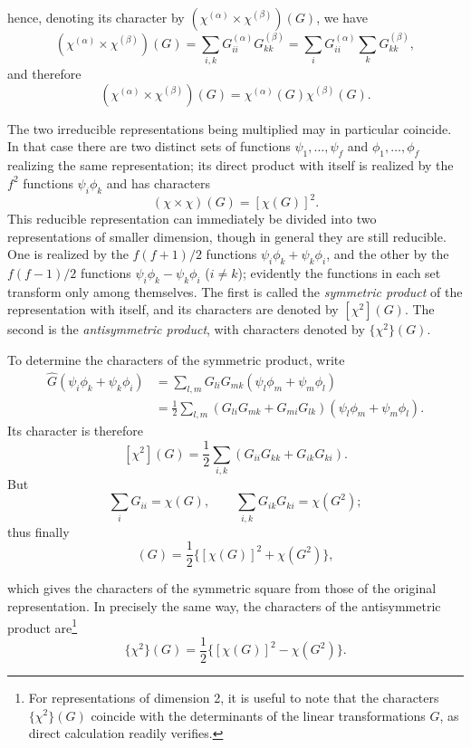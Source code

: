 hence, denoting its character by $(\chi^{(\alpha)}\mathbin{\times}\chi^{(\beta)})(G)$, we have
\[
 (\chi^{(\alpha)}\mathbin{\times}\chi^{(\beta)})(G)
 =\sum_{i,k}G_{ii}^{(\alpha)}G_{kk}^{(\beta)}
 =\sum_iG_{ii}^{(\alpha)}\sum_kG_{kk}^{(\beta)},
\]
and therefore
\begin{equation}
 (\chi^{(\alpha)}\mathbin{\times}\chi^{(\beta)})(G)
 =\chi^{(\alpha)}(G)\chi^{(\beta)}(G).
 \tag{94.21}
\end{equation}

The two irreducible representations being multiplied may in particular coincide. In that case there are two distinct sets of functions $\psi_1,\ldots,\psi_f$ and $\phi_1,\ldots,\phi_f$ realizing the same representation; its direct product with itself is realized by the $f^2$ functions $\psi_i\phi_k$ and has characters
\[
 (\chi\mathbin{\times}\chi)(G)=[\chi(G)]^2.
\]
This reducible representation can immediately be divided into two representations of smaller dimension, though in general they are still reducible. One is realized by the $f(f+1)/2$ functions $\psi_i\phi_k+\psi_k\phi_i$, and the other by the $f(f-1)/2$ functions $\psi_i\phi_k-\psi_k\phi_i$ ($i\ne k$); evidently the functions in each set transform only among themselves. The first is called the \emph{symmetric product} of the representation with itself, and its characters are denoted by $[\chi^2](G)$. The second is the \emph{antisymmetric product}, with characters denoted by $\{\chi^2\}(G)$.

To determine the characters of the symmetric product, write
\[
 \begin{aligned}
 \widehat G(\psi_i\phi_k+\psi_k\phi_i)
 &=\sum_{l,m}G_{li}G_{mk}(\psi_l\phi_m+\psi_m\phi_l)\\
 &=\frac12\sum_{l,m}(G_{li}G_{mk}+G_{mi}G_{lk})(\psi_l\phi_m+\psi_m\phi_l).
 \end{aligned}
\]
Its character is therefore
\[
 [\chi^2](G)=\frac12\sum_{i,k}(G_{ii}G_{kk}+G_{ik}G_{ki}).
\]
But
\[
 \sum_iG_{ii}=\chi(G),\qquad \sum_{i,k}G_{ik}G_{ki}=\chi(G^2);
\]
thus finally
\begin{equation}
 [\chi^2](G)=\frac12\{[\chi(G)]^2+\chi(G^2)\},
 \tag{94.22}
\end{equation}

which gives the characters of the symmetric square from those of the original representation. In precisely the same way, the characters of the antisymmetric product are\footnote{For representations of dimension 2, it is useful to note that the characters $\{\chi^2\}(G)$ coincide with the determinants of the linear transformations $G$, as direct calculation readily verifies.}
\begin{equation}
 \{\chi^2\}(G)=\frac12\{[\chi(G)]^2-\chi(G^2)\}.
 \tag{94.23}
\end{equation}


